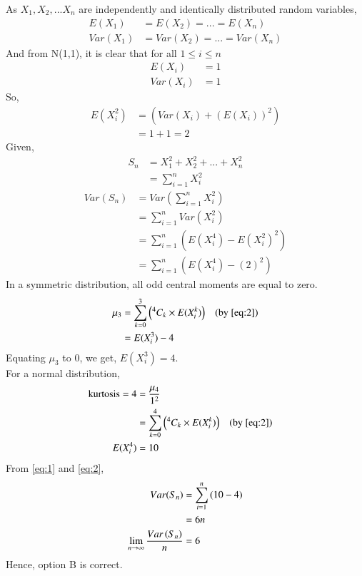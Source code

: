 \documentclass[journal,12pt,twocolumn]{IEEEtran}
\begin{document}
As $X_{1},X_{2},...X_n$ are independently and identically distributed random variables, \begin{align*}
    E(X_{1})&=E(X_{2})=...=E(X_n) \\
    Var(X_{1})&=Var(X_{2})=...=Var(X_n)
\end{align*}
And from N(1,1), it is clear that for all
$1 \leq i \leq n$
\begin{align*}
    E(X_{i}) &=1 \\
    Var(X_{i})&= 1  
\end{align*}
So,
\begin{align*}
    E(X_{i}^2)  &=  (  Var(X_i) + (E({X_i}))^2 )\\
    &=1+1 = 2
\end{align*}
Given,\begin{align*}
    S_{n} &= X_{1}^{2}+X_{2}^2+...+X_{n}^{2}\\
    &= \sum_{i=1}^n{X_{i}^2} 
    \end{align*}
       \begin{align}
    Var(S_n) &= Var\left( \sum_{i=1}^n{X_{i}^2}\right)\nonumber  \\
   &= \sum_{i=1}^n{ Var(X_{i}^2)}\nonumber \\
    &=\sum_{i=1}^n{\left(E(X_i^4)-E(X_i^2)^2\right)} \nonumber\\
    &= \sum_{i=1}^n{\left(E(X_i^4) - (2)^2\right)}\label{eq:1}
\end{align}
In a symmetric distribution, all odd central moments are equal to zero. 
\begin{align*}
\mu_3  &= \sum_{k=0}^3 \left(\Comb{4}{k} \times E(X_i^k) \right)  & & \text{(by  \cref{eq:2})}\\
    &= E(X_i^3) - 4
\end{align*}
Equating $\mu_3$ to 0, we get,  $E(X_i^3) = 4.$\\
For a normal distribution, \begin{align}
    \text{kurtosis} = 4 
    &= \frac{\mu_4}{1^2} \nonumber\\
    &= \sum_{k=0}^4 \left(\Comb{4}{k} \times E(X_i^k) \right) & & \text{(by  \cref{eq:2})}\nonumber\\
     E(X_i^4) &= 10 \label{eq:3}
\end{align}
 From  \cref{eq:1} and \cref{eq:2},
 \begin{align*}
     Var(S_n) &= \sum_{i=1}^n{(10-4)}\\
     &= 6n\\
     \lim_{n \to \infty}{\frac{Var\left(S_{n}\right)}{n}} &= 6
 \end{align*}
 Hence, option B is correct.
\end{document}
